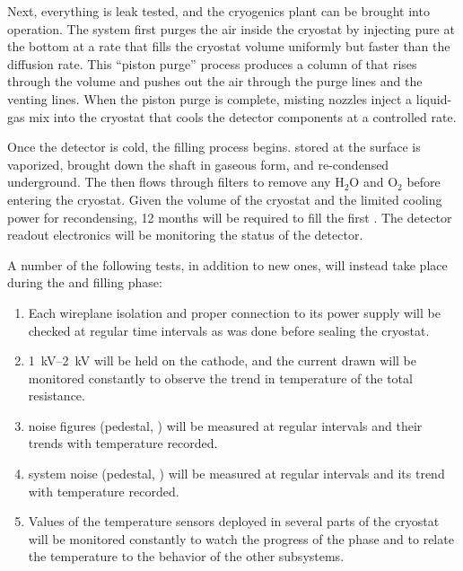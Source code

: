 Next, everything is leak tested, and the cryogenics plant can be brought into operation. The system first purges the air inside the cryostat  by injecting pure  at the bottom  at a rate that fills the cryostat volume uniformly but faster than the diffusion rate. This ``piston purge'' process produces a column of   that rises through the volume and pushes out the air through the  purge lines and the  venting lines.  When the piston purge is complete, misting nozzles inject a liquid-gas mix into the cryostat that cools the detector components at a controlled rate. 


Once the detector is cold, the filling process begins.  stored at the surface  
is vaporized, brought down the shaft in gaseous form, and re-condensed underground. The \lar then flows through filters to remove any H$_2$O and O$_2$ before entering the cryostat. Given the volume of the cryostat and the limited cooling power for recondensing, \num{12} months will be required to fill the first . The detector readout electronics will be  monitoring the status of the detector. 



A number of the following tests, in addition to new ones, will instead take place during the \cooldown and filling phase: 

\begin{enumerate}


    \item Each  wireplane isolation and proper connection to its  power supply will be checked at regular time intervals as was done before sealing the cryostat.
    
    \item \SIrange{1}{2}{kV} will be held on the cathode, and the current drawn will be  monitored constantly to observe the trend in temperature of the total resistance.
    
    \item {} noise figures (pedestal, ) will be measured at regular intervals and their trends with temperature recorded.
    
    \item {} system noise (pedestal, ) will be measured at regular intervals and its trend with temperature recorded.
    
     \item Values of the temperature sensors deployed in several parts of the cryostat will be monitored constantly to watch the progress of the \cooldown phase and to relate the temperature to the behavior of the other  subsystems. 
     
\end{enumerate}

